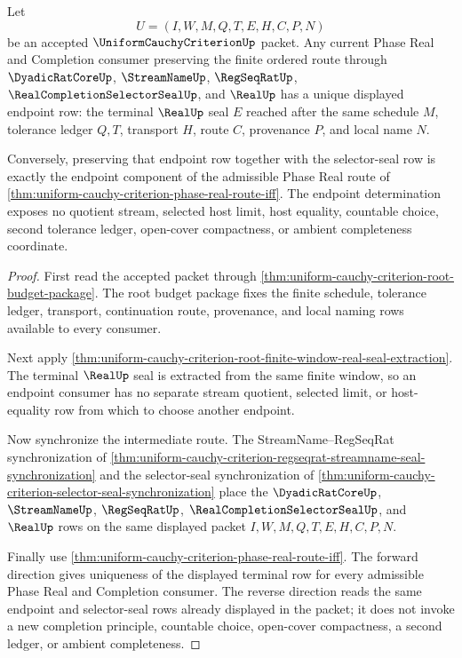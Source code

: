 \begin{theorem}
\label{thm:uniform-cauchy-criterion-phase-real-endpoint-determinacy}
Let
$$
U=(I,W,M,Q,T,E,H,C,P,N)
$$
be an accepted $\UniformCauchyCriterionUp$ packet. Any current Phase Real and Completion consumer preserving the finite ordered route through $\DyadicRatCoreUp$, $\StreamNameUp$, $\RegSeqRatUp$, $\RealCompletionSelectorSealUp$, and $\RealUp$ has a unique displayed endpoint row: the terminal $\RealUp$ seal $E$ reached after the same schedule $M$, tolerance ledger $Q,T$, transport $H$, route $C$, provenance $P$, and local name $N$.

Conversely, preserving that endpoint row together with the selector-seal row is exactly the endpoint component of the admissible Phase Real route of \autoref{thm:uniform-cauchy-criterion-phase-real-route-iff}. The endpoint determination exposes no quotient stream, selected host limit, host equality, countable choice, second tolerance ledger, open-cover compactness, or ambient completeness coordinate.
\end{theorem}
\begin{proof}
First read the accepted packet through \autoref{thm:uniform-cauchy-criterion-root-budget-package}. The root budget package fixes the finite schedule, tolerance ledger, transport, continuation route, provenance, and local naming rows available to every consumer.

Next apply \autoref{thm:uniform-cauchy-criterion-root-finite-window-real-seal-extraction}. The terminal $\RealUp$ seal is extracted from the same finite window, so an endpoint consumer has no separate stream quotient, selected limit, or host-equality row from which to choose another endpoint.

Now synchronize the intermediate route. The StreamName--RegSeqRat synchronization of \autoref{thm:uniform-cauchy-criterion-regseqrat-streamname-seal-synchronization} and the selector-seal synchronization of \autoref{thm:uniform-cauchy-criterion-selector-seal-synchronization} place the $\DyadicRatCoreUp$, $\StreamNameUp$, $\RegSeqRatUp$, $\RealCompletionSelectorSealUp$, and $\RealUp$ rows on the same displayed packet $I,W,M,Q,T,E,H,C,P,N$.

Finally use \autoref{thm:uniform-cauchy-criterion-phase-real-route-iff}. The forward direction gives uniqueness of the displayed terminal row for every admissible Phase Real and Completion consumer. The reverse direction reads the same endpoint and selector-seal rows already displayed in the packet; it does not invoke a new completion principle, countable choice, open-cover compactness, a second ledger, or ambient completeness.
\end{proof}


